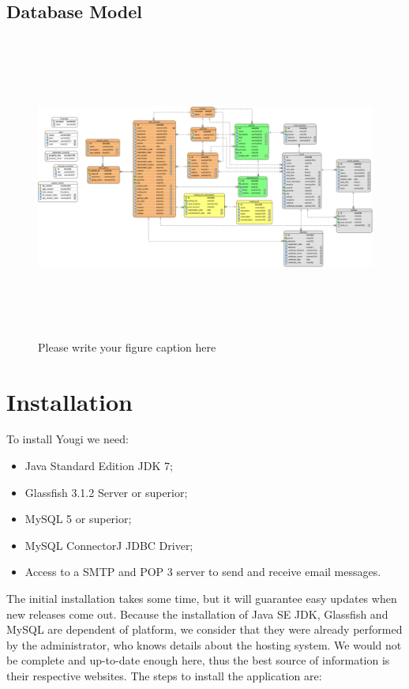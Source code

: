 \documentclass[envcountsame,envcountchap]{svmono}
\begin{document}
\section{Database Model}

\begin{figure}
\centering
\includegraphics[height=10cm, angle=90]{figures/relational-model}
\caption{Please write your figure caption here}
\label{fig:1}
\end{figure}

\chapter{Installation}

To install Yougi we need:

\begin{itemize}
\item Java Standard Edition JDK 7;
\item Glassfish 3.1.2 Server or superior;
\item MySQL 5 or superior;
\item MySQL ConnectorJ JDBC Driver;
\item Access to a SMTP and POP 3 server to send and receive email messages.
\end{itemize}

The initial installation takes some time, but it will guarantee easy updates when new releases come out. Because the installation of Java SE JDK, Glassfish and MySQL are dependent of platform, we consider that they were already performed by the administrator, who knows details about the hosting system. We would not be complete and up-to-date enough here, thus the best source of information is their respective websites. The steps to install the application are:
\end{document}
